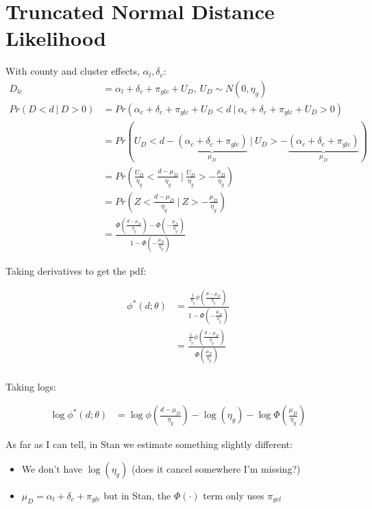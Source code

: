 \documentclass{article}
\begin{document}
    

\section*{Truncated Normal Distance Likelihood}

With county and cluster effects, $\alpha_l, \delta_c$:
\begin{align*}
  D_{lc} &= \alpha_l + \delta_c + \pi_{glc} + U_D, \ U_D \sim N(0, \eta_g) \\
  Pr(D < d \ |\  D > 0 ) &= Pr(\alpha_c + \delta_c + \pi_{glc} + U_D < d \ | \ 
  \alpha_c + \delta_c + \pi_{glc} + U_D > 0) \\
   &= Pr( U_D < d -  \underbrace{(\alpha_c + \delta_c + \pi_{glc})}_{\mu_D}\   |\  
    U_D > - \underbrace{(\alpha_c + \delta_c + \pi_{glc})}_{\mu_D}) \\ 
   &= Pr\left( \frac{U_D}{\eta_g} <  \frac{d - \mu_D}{\eta_g} \   |\  
    \frac{U_D}{\eta_g} > - \frac{\mu_D}{\eta_g}\right) \\  
    &= Pr(Z < \frac{d - \mu_D}{\eta_g} \ |\  Z > -\frac{\mu_D}{\eta_g} ) \\
    &= \frac{
      \Phi\left( \frac{d - \mu_D}{\eta_g}\right) - \Phi\left(
        -\frac{\mu_D}{\eta_g}
      \right)
    }{1 - \Phi\left(-\frac{\mu_D}{\eta_g}\right)}
\end{align*}

Taking derivatives to get the pdf:

\begin{align*}
  \phi^*(d; \theta) &= \frac{
    \frac{1}{\eta_g}\phi\left(\frac{d - \mu_D}{\eta_g}\right)
  }{1 - \Phi\left(-\frac{\mu_D}{\eta_g}\right)} \\ 
   &= \frac{
    \frac{1}{\eta_g}\phi\left(\frac{d - \mu_D}{\eta_g}\right)
  }{\Phi\left(\frac{\mu_D}{\eta_g}\right)} \\ 
\end{align*}


Taking logs:

\begin{align*}
  \log \phi^*(d;\theta) &= \log \phi\left(\frac{d - \mu_D}{\eta_g}\right) - 
  \log(\eta_g) - \log \Phi\left(\frac{\mu_D}{\eta_g}\right)
\end{align*}

As far as I can tell, in Stan we estimate something slightly different:

\begin{itemize}
  \item We don't have $\log(\eta_g)$ (does it cancel somewhere I'm missing?)
  \item $\mu_D = \alpha_l + \delta_c + \pi_{glc}$ but in Stan, the $\Phi(\cdot)$ 
   term only uses $\pi_{gcl}$
\end{itemize}
\end{document}
